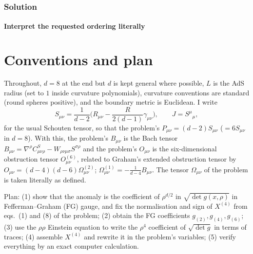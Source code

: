 \subsubsection*{Solution}
\paragraph*{Interpret the requested ordering literally}

\section{Conventions and plan}
Throughout, $d=8$ at the end but $d$ is kept general where possible, $L$ is the AdS radius (set to $1$ inside curvature polynomials), curvature conventions are standard (round spheres positive), and the boundary metric is Euclidean. I write
\begin{equation}
S_{\mu\nu}=\frac{1}{d-2}\Big(R_{\mu\nu}-\frac{R}{2(d-1)}\gamma_{\mu\nu}\Big),\qquad J=S^\mu{}_\mu ,
\end{equation}
for the usual Schouten tensor, so that the problem's $P_{\mu\nu}=(d-2)S_{\mu\nu}$ ($=6S_{\mu\nu}$ in $d=8$). With this, the problem's $B_{\mu\nu}$ is the Bach tensor $B_{\mu\nu}=\nabla^\rho C^S_{\mu\nu\rho}-W_{\rho\nu\mu\sigma}S^{\sigma\rho}$ and the problem's $O_{\mu\nu}$ is the six-dimensional obstruction tensor $O^{(6)}_{\mu\nu}$, related to Graham's extended obstruction tensor by $O_{\mu\nu}=(d-4)(d-6)\Omega^{(2)}_{\mu\nu}$; $\Omega^{(1)}_{\mu\nu}=-\frac{1}{d-4}B_{\mu\nu}$. The tensor $\Omega_{\mu\nu}$ of the problem is taken literally as defined.

Plan: (1) show that the anomaly is the coefficient of $\rho^{d/2}$ in $\sqrt{\det g(x,\rho)}$ in Fefferman--Graham (FG) gauge, and fix the normalisation and sign of $X^{(4)}$ from eqs.~(1) and (8) of the problem; (2) obtain the FG coefficients $g_{(2)},g_{(4)},g_{(6)}$; (3) use the $\rho\rho$ Einstein equation to write the $\rho^4$ coefficient of $\sqrt{\det g}$ in terms of traces; (4) assemble $X^{(4)}$ and rewrite it in the problem's variables; (5) verify everything by an exact computer calculation.

